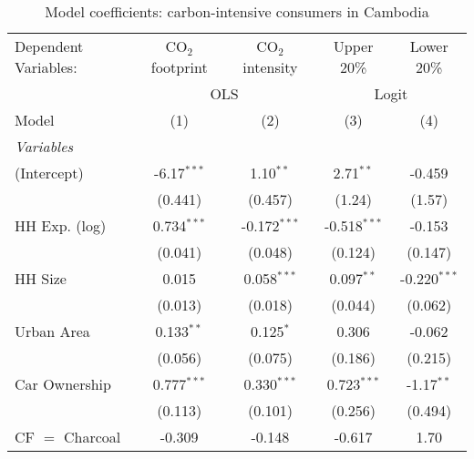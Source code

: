 
\begin{table}[htbp!]
   \centering
   \small
   \begin{adjustbox}{width = 1\textwidth, max height = 0.95\textheight, center}
      \begin{threeparttable}[b]
         \caption{\label{tab:Logit_1_KHM} Model coefficients: carbon-intensive consumers in Cambodia}
         \begin{tabular}{lcccc}
            \tabularnewline \midrule \midrule
            Dependent Variables: & CO$_{2}$ footprint & CO$_{2}$ intensity & Upper 20\%     & Lower 20\%\\   
             & \multicolumn{2}{c}{OLS} & \multicolumn{2}{c}{Logit} \\ 
            Model                & (1)                & (2)                & (3)            & (4)\\  
            \midrule
            \emph{Variables}\\
            (Intercept)          & -6.17$^{***}$      & 1.10$^{**}$        & 2.71$^{**}$    & -0.459\\   
                                 & (0.441)            & (0.457)            & (1.24)         & (1.57)\\   
            HH Exp. (log)        & 0.734$^{***}$      & -0.172$^{***}$     & -0.518$^{***}$ & -0.153\\   
                                 & (0.041)            & (0.048)            & (0.124)        & (0.147)\\   
            HH Size              & 0.015              & 0.058$^{***}$      & 0.097$^{**}$   & -0.220$^{***}$\\   
                                 & (0.013)            & (0.018)            & (0.044)        & (0.062)\\   
            Urban Area           & 0.133$^{**}$       & 0.125$^{*}$        & 0.306          & -0.062\\   
                                 & (0.056)            & (0.075)            & (0.186)        & (0.215)\\   
            Car Ownership        & 0.777$^{***}$      & 0.330$^{***}$      & 0.723$^{***}$  & -1.17$^{**}$\\   
                                 & (0.113)            & (0.101)            & (0.256)        & (0.494)\\   
            CF $=$ Charcoal      & -0.309             & -0.148             & -0.617         & 1.70\\   

\end{tabular}
\end{threeparttable}
\end{adjustbox}
\end{table}

